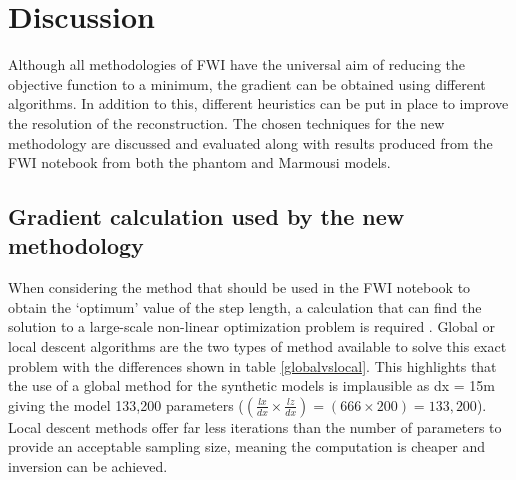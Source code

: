 \chapter{Discussion}
Although all methodologies of FWI have the universal aim of reducing the objective function to a minimum, the gradient can be obtained using different algorithms. In addition to this, different heuristics can be put in place to improve the resolution of the reconstruction. The chosen techniques for the new methodology are discussed and evaluated along with results produced from the FWI notebook from both the phantom and Marmousi models.  

\section{Gradient calculation used by the new methodology}



When considering the method that should be used in the FWI notebook to obtain the `optimum' value of the step length, a calculation that can find the solution to a large-scale non-linear optimization problem is required \citep{metivier2016seiscope}. Global or local descent algorithms are the two types of method available to solve this exact problem with the differences shown in table \ref{globalvslocal}. 
This highlights that the use of a global method for the synthetic models is implausible as dx = 15m giving the model 133,200 parameters ($\left (\frac{lx}{dx} \times \frac{lz}{dx} \right ) = (666 \times 200) = 133,200 $). Local descent methods offer far less iterations than the number of parameters to provide an acceptable sampling size, meaning the computation is cheaper and inversion can be achieved. 

